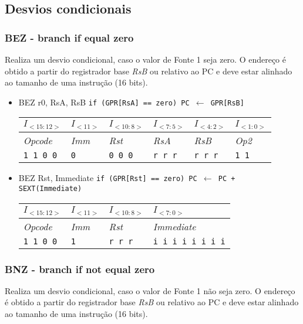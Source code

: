 \documentclass{extreport}
\begin{document}
\subsection{Desvios condicionais}
\subsubsection{BEZ - branch if equal zero}
Realiza um desvio condicional, caso o valor de Fonte 1 seja zero. O endereço é obtido a partir do registrador base \textit{RsB} ou relativo ao PC e deve estar alinhado ao tamanho de uma instrução (16 bits).

\begin{itemize}
\item BEZ r0, RsA, RsB
\subitem \texttt{if (GPR[RsA] == zero) PC $\leftarrow$ GPR[RsB]}
\begin{table}[ht!]
\centering
\begin{tabular}{|p{1.6cm}|p{1.6cm}|p{1.6cm}|p{1.6cm}|p{1.6cm}|p{1.6cm}|}
\hline
$I_{<15:12>}$ & $I_{<11>}$ & $I_{<10:8>}$ & $I_{<7:5>}$ & $I_{<4:2>}$ & $I_{<1:0>}$ \\ \hline
\textit{Opcode} & \textit{Imm} & \textit{Rst} & \textit{RsA} & \textit{RsB} & \textit{Op2} \\ \hline
\texttt{1 1 0 0} & \texttt{0} & \texttt{0 0 0} & \texttt{r r r} & \texttt{r r r} & \texttt{1 1} \\ \hline
\end{tabular}
\end{table}

\item BEZ Rst, Immediate
\subitem \texttt{if (GPR[Rst] == zero) PC $\leftarrow$ PC + SEXT(Immediate)}
\begin{table}[ht!]
\centering
\begin{tabular}{|p{1.6cm}|p{1.6cm}|p{1.6cm}|p{5.65cm}|}
\hline
$I_{<15:12>}$ & $I_{<11>}$ & $I_{<10:8>}$ & $I_{<7:0>}$ \\ \hline
\textit{Opcode} & \textit{Imm} & \textit{Rst} & \textit{Immediate} \\ \hline
\texttt{1 1 0 0} & \texttt{1} & \texttt{r r r} & \texttt{i i i i i i i i} \\ \hline
\end{tabular}
\end{table}
\end{itemize}

\subsubsection{BNZ - branch if not equal zero}
Realiza um desvio condicional, caso o valor de Fonte 1 não seja zero. O endereço é obtido a partir do registrador base \textit{RsB} ou relativo ao PC e deve estar alinhado ao tamanho de uma instrução (16 bits).
\end{document}
